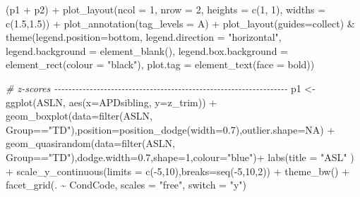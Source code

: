 \documentclass[a4paper, twoside]{templates/ociamthesis}
\newenvironment{Shaded}{\begin{snugshade}}{\end{snugshade}}
\newcommand{\AttributeTok}[1]{\textcolor[rgb]{0.77,0.63,0.00}{#1}}
\newcommand{\CommentTok}[1]{\textcolor[rgb]{0.56,0.35,0.01}{\textit{#1}}}
\newcommand{\ConstantTok}[1]{\textcolor[rgb]{0.00,0.00,0.00}{#1}}
\newcommand{\DecValTok}[1]{\textcolor[rgb]{0.00,0.00,0.81}{#1}}
\newcommand{\FloatTok}[1]{\textcolor[rgb]{0.00,0.00,0.81}{#1}}
\newcommand{\FunctionTok}[1]{\textcolor[rgb]{0.00,0.00,0.00}{#1}}
\newcommand{\NormalTok}[1]{#1}
\newcommand{\OtherTok}[1]{\textcolor[rgb]{0.56,0.35,0.01}{#1}}
\newcommand{\SpecialCharTok}[1]{\textcolor[rgb]{0.00,0.00,0.00}{#1}}
\newcommand{\StringTok}[1]{\textcolor[rgb]{0.31,0.60,0.02}{#1}}
\renewenvironment{Shaded}
{
  \vspace{4pt}%
  \begin{snugshade}%
}{%
  \end{snugshade}%
  \vspace{4pt}%
}
\begin{document}
\begin{Shaded}
\begin{Highlighting}[]
\NormalTok{(p1 }\SpecialCharTok{+}\NormalTok{ p2) }\SpecialCharTok{+} \FunctionTok{plot\_layout}\NormalTok{(}\AttributeTok{ncol =} \DecValTok{1}\NormalTok{, }\AttributeTok{nrow =} \DecValTok{2}\NormalTok{, }\AttributeTok{heights =} \FunctionTok{c}\NormalTok{(}\DecValTok{1}\NormalTok{, }\DecValTok{1}\NormalTok{), }\AttributeTok{widths =} \FunctionTok{c}\NormalTok{(}\FloatTok{1.5}\NormalTok{,}\FloatTok{1.5}\NormalTok{)) }\SpecialCharTok{+} \FunctionTok{plot\_annotation}\NormalTok{(}\AttributeTok{tag\_levels =} \StringTok{\textquotesingle{}A\textquotesingle{}}\NormalTok{) }\SpecialCharTok{+} \FunctionTok{plot\_layout}\NormalTok{(}\AttributeTok{guides=}\StringTok{\textquotesingle{}collect\textquotesingle{}}\NormalTok{) }\SpecialCharTok{\&}
  \FunctionTok{theme}\NormalTok{(}\AttributeTok{legend.position=}\StringTok{\textquotesingle{}bottom\textquotesingle{}}\NormalTok{,        }
        \AttributeTok{legend.direction =} \StringTok{"horizontal"}\NormalTok{,}
        \AttributeTok{legend.background =} \FunctionTok{element\_blank}\NormalTok{(),}
        \AttributeTok{legend.box.background =} \FunctionTok{element\_rect}\NormalTok{(}\AttributeTok{colour =} \StringTok{"black"}\NormalTok{),}
        \AttributeTok{plot.tag =} \FunctionTok{element\_text}\NormalTok{(}\AttributeTok{face =} \StringTok{\textquotesingle{}bold\textquotesingle{}}\NormalTok{))}

\CommentTok{\# z{-}scores {-}{-}{-}{-}{-}{-}{-}{-}{-}{-}{-}{-}{-}{-}{-}{-}{-}{-}{-}{-}{-}{-}{-}{-}{-}{-}{-}{-}{-}{-}{-}{-}{-}{-}{-}{-}{-}{-}{-}{-}{-}{-}{-}{-}{-}{-}{-}{-}{-}{-}{-}{-}{-}{-}{-}{-}{-}{-}{-}{-}{-}{-}{-}{-}{-}{-}}
\NormalTok{p1 }\OtherTok{\textless{}{-}} \FunctionTok{ggplot}\NormalTok{(ASLN, }\FunctionTok{aes}\NormalTok{(}\AttributeTok{x=}\NormalTok{APDsibling, }\AttributeTok{y=}\NormalTok{z\_trim)) }\SpecialCharTok{+}
  \FunctionTok{geom\_boxplot}\NormalTok{(}\AttributeTok{data=}\FunctionTok{filter}\NormalTok{(ASLN, Group}\SpecialCharTok{==}\StringTok{"TD"}\NormalTok{),}\AttributeTok{position=}\FunctionTok{position\_dodge}\NormalTok{(}\AttributeTok{width=}\FloatTok{0.7}\NormalTok{),}\AttributeTok{outlier.shape=}\ConstantTok{NA}\NormalTok{) }\SpecialCharTok{+}
  \FunctionTok{geom\_quasirandom}\NormalTok{(}\AttributeTok{data=}\FunctionTok{filter}\NormalTok{(ASLN, Group}\SpecialCharTok{==}\StringTok{"TD"}\NormalTok{),}\AttributeTok{dodge.width=}\FloatTok{0.7}\NormalTok{,}\AttributeTok{shape=}\DecValTok{1}\NormalTok{,}\AttributeTok{colour=}\StringTok{"blue"}\NormalTok{)}\SpecialCharTok{+}
  \FunctionTok{labs}\NormalTok{(}\AttributeTok{title =} \StringTok{"ASL"}\NormalTok{ ) }\SpecialCharTok{+} 
  \FunctionTok{scale\_y\_continuous}\NormalTok{(}\AttributeTok{limits =} \FunctionTok{c}\NormalTok{(}\SpecialCharTok{{-}}\DecValTok{5}\NormalTok{,}\DecValTok{10}\NormalTok{),}\AttributeTok{breaks=}\FunctionTok{seq}\NormalTok{(}\SpecialCharTok{{-}}\DecValTok{5}\NormalTok{,}\DecValTok{10}\NormalTok{,}\DecValTok{2}\NormalTok{)) }\SpecialCharTok{+}
  \FunctionTok{theme\_bw}\NormalTok{() }\SpecialCharTok{+}
  \FunctionTok{facet\_grid}\NormalTok{(. }\SpecialCharTok{\textasciitilde{}}\NormalTok{ CondCode, }\AttributeTok{scales =} \StringTok{"free"}\NormalTok{, }\AttributeTok{switch =} \StringTok{"y"}\NormalTok{)}


\end{Highlighting}
\end{Shaded}
\end{document}
